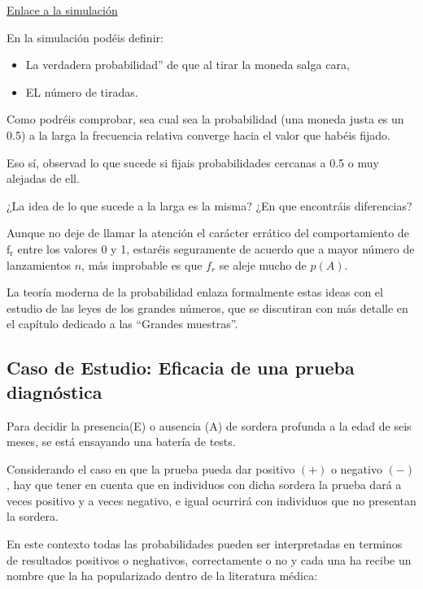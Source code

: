\documentclass[
]{article}
\providecommand{\tightlist}{%
  \setlength{\itemsep}{0pt}\setlength{\parskip}{0pt}}
\begin{document}
\href{https://www.grbio.eu/statmedia/Statmedia_1/}{Enlace a la simulación}

En la simulación podéis definir:

\begin{itemize}
\tightlist
\item
  La verdadera probabilidad'' de que al tirar la moneda salga cara,
\item
  EL número de tiradas.
\end{itemize}

Como podréis comprobar, sea cual sea la probabilidad (una moneda justa es un 0.5) a la larga la frecuencia relativa converge hacia el valor que habéis fijado.

Eso sí, observad lo que sucede si fijais probabilidades cercanas a 0.5 o muy alejadas de ell.

¿La idea de lo que sucede a la larga es la misma? ¿En que encontráis diferencias?

Aunque no deje de llamar la atención el carácter errático del comportamiento de \(\mathrm{f}_{\mathrm{r}}\) entre los valores 0 y 1, estaréis seguramente de acuerdo que a mayor
número de lanzamientos \(n\), más improbable es que \(f_{r}\) se aleje
mucho de \(p(A)\).

La teoría moderna de la probabilidad enlaza formalmente estas ideas con
el estudio de las leyes de los grandes números, que se discutiran con más detalle en el capítulo dedicado a las ``Grandes muestras''.

\subsection{Caso de Estudio: Eficacia de una prueba diagnóstica}\label{caso-de-estudio-eficacia-de-una-prueba-diagnuxf3stica}

Para decidir la presencia(E) o ausencia (A) de sordera profunda a la edad de seis meses, se está ensayando una batería de tests.

Considerando el caso en que la prueba pueda dar positivo \((+)\) o negativo \((-)\), hay que tener en cuenta que en individuos con dicha sordera la prueba dará a veces positivo y a veces negativo, e igual ocurrirá con individuos que no presentan la sordera.

En este contexto todas las probabilidades pueden ser interpretadas en terminos de resultados positivos o neghativos, correctamente o no y cada una ha recibe un nombre que la ha popularizado dentro de la literatura médica:
\end{document}
